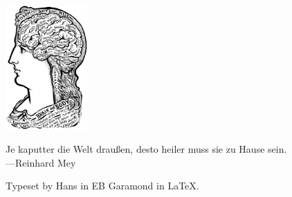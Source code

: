 \documentclass{article}
\renewcommand{\c}[1]{{\textcolor{christmas}{#1}}}
\begin{document}
\vfill\includegraphics[height=4.75cm]{head}

\vfill\begin{minipage}[c]{.8\textwidth}\centering%
    \c{\glqq}Je kaputter die Welt draußen,
    desto heiler muss sie zu Hause sein.\c{\grqq}\\[2mm]
    \c{---}Reinhard Mey %
\end{minipage}

\newpage\restoregeometry %
\vfill Typeset by Hans in EB Garamond in \LaTeX.
\end{document}
